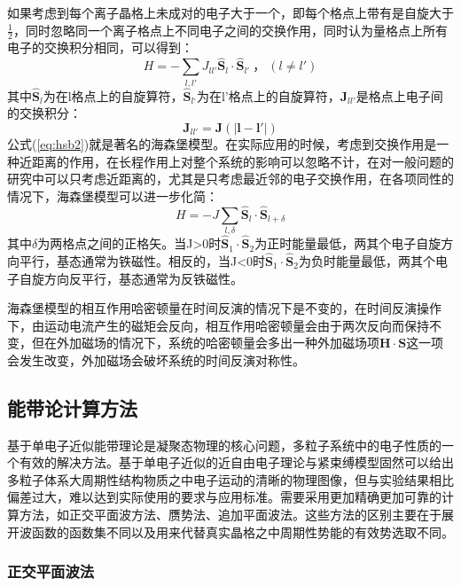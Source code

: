 如果考虑到每个离子晶格上未成对的电子大于一个，即每个格点上带有是自旋大于$\frac{1}{2}$，同时忽略同一个离子格点上不同电子之间的交换作用，同时认为量格点上所有电子的交换积分相同，可以得到：
\begin{equation}
    H = -\sum_{l,l'} J_{ll'}\hat{\bm{S}}_{l}\cdot\hat{\bm{S}}_{l'} \ \text{，}\ (l \neq l' )
    \label{eq:hsb2}
\end{equation}
其中$\hat{\bm{S}}_{l}$为在l格点上的自旋算符，$\hat{\bm{S}}_{l‘}$为在l’格点上的自旋算符，$\bm{J}_{ll'}$是格点上电子间的交换积分：
\begin{equation}
    \bm{J}_{ll'}=\bm{J}(|\bm{l}-\bm{l'}|)
    \label{eq:hsb3}
\end{equation}
公式(\ref{eq:hsb2})就是著名的海森堡模型。在实际应用的时候，考虑到交换作用是一种近距离的作用，在长程作用上对整个系统的影响可以忽略不计，在对一般问题的研究中可以只考虑近距离的，尤其是只考虑最近邻的电子交换作用，在各项同性的情况下，海森堡模型可以进一步化简：
\begin{equation}
    H=-J\sum_{l,\delta}\hat{\bm{S}}_{l}\cdot \hat{\bm{S}}_{l+\delta}
    \label{eq:hsb4}
\end{equation}
其中$\delta$为两格点之间的正格矢。当J>0时$\hat{\bm{S}}_{1}\cdot\hat{\bm{S}}_{2}$为正时能量最低，两其个电子自旋方向平行，基态通常为铁磁性。相反的，当J<0时$\hat{\bm{S}}_{1}\cdot\hat{\bm{S}}_{2}$为负时能量最低，两其个电子自旋方向反平行，基态通常为反铁磁性。

海森堡模型的相互作用哈密顿量在时间反演的情况下是不变的，在时间反演操作下，由运动电流产生的磁矩会反向，相互作用哈密顿量会由于两次反向而保持不变，但在外加磁场的情况下，系统的哈密顿量会多出一种外加磁场项$\bm{H}\cdot\bm{S}$这一项会发生改变，外加磁场会破坏系统的时间反演对称性。

\subsection{能带论计算方法}
基于单电子近似能带理论是凝聚态物理的核心问题，多粒子系统中的电子性质的一个有效的解决方法。基于单电子近似的近自由电子理论与紧束缚模型固然可以给出多粒子体系大周期性结构物质之中电子运动的清晰的物理图像，但与实验结果相比偏差过大，难以达到实际使用的要求与应用标准。需要采用更加精确更加可靠的计算方法，如正交平面波方法、赝势法、追加平面波法。这些方法的区别主要在于展开波函数的函数集不同以及用来代替真实晶格之中周期性势能的有效势选取不同。

\subsubsection{正交平面波法}

